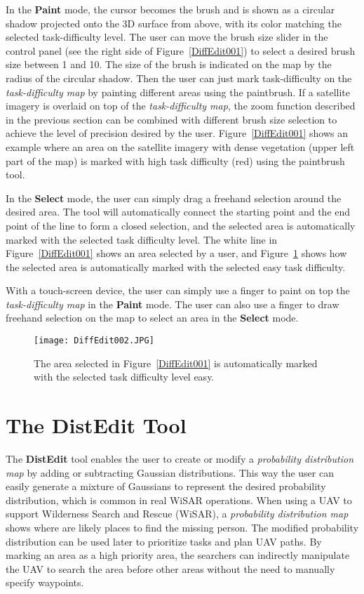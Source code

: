 In the \textbf{Paint} mode, the cursor becomes the brush and is shown as a circular shadow projected onto the 3D surface from above, with its color matching the selected task-difficulty level. The user can move the brush size slider in the control panel (see the right side of Figure~\ref{DiffEdit001}) to select a desired brush size between 1 and 10. The size of the brush is indicated on the map by the radius of the circular shadow. Then the user can just mark task-difficulty on the \textit{task-difficulty map} by painting different areas using the paintbrush. If a satellite imagery is overlaid on top of the \textit{task-difficulty map}, the zoom function described in the previous section can be combined with different brush size selection to achieve the level of precision desired by the user. Figure~\ref{DiffEdit001} shows an example where an area on the satellite imagery with dense vegetation (upper left part of the map) is marked with high task difficulty (red) using the paintbrush tool.

In the \textbf{Select} mode, the user can simply drag a freehand selection around the desired area. The tool will automatically connect the starting point and the end point of the line to form a closed selection, and the selected area is automatically marked with the selected task difficulty level. The white line in Figure~\ref{DiffEdit001} shows an area selected by a user, and Figure~\ref{DiffEdit002} shows how the selected area is automatically marked with the selected easy task difficulty.

With a touch-screen device, the user can simply use a finger to paint on top the \textit{task-difficulty map} in the \textbf{Paint} mode. The user can also use a finger to draw freehand selection on the map to select an area in the \textbf{Select} mode.


\begin{figure}
\centering
\texttt{[image: DiffEdit002.JPG]}
\caption{The area selected in Figure~\ref{DiffEdit001} is automatically marked with the selected task difficulty level easy.}
\label{DiffEdit002}
\end{figure}

\section{The DistEdit Tool}
\label{DistEdit}

The \textbf{DistEdit} tool enables the user to create or modify a \textit{probability distribution map} by adding or subtracting Gaussian distributions. This way the user can easily generate a mixture of Gaussians to represent the desired probability distribution, which is common in real WiSAR operations.  When using a UAV to support Wilderness Search and Rescue (WiSAR), a \textit{probability distribution map} shows where are likely places to find the missing person. The modified probability distribution can be used later to prioritize tasks and plan UAV paths. By marking an area as a high priority area, the searchers can indirectly manipulate the UAV to search the area before other areas without the need to manually specify waypoints.


